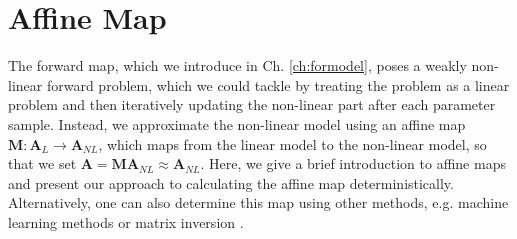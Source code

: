 

\section{Affine Map}
\label{sec:affine}
The forward map, which we introduce in Ch. \ref{ch:formodel}, poses a weakly non-linear forward problem, which we could tackle by treating the problem as a linear problem and then iteratively updating the non-linear part after each parameter sample.
Instead, we approximate the non-linear model using an affine map $ \bm{M}:\bm{A}_L \rightarrow \bm{A}_{NL}$, which maps from the linear model to the non-linear model, so that we set $ \bm{A} = \bm{M} \bm{A}_{NL} \approx \bm{A}_{NL} $.
Here, we give a brief introduction to affine maps and present our approach to calculating the affine map deterministically. 
Alternatively, one can also determine this map using other methods, e.g. machine learning methods or matrix inversion \cite{}.


